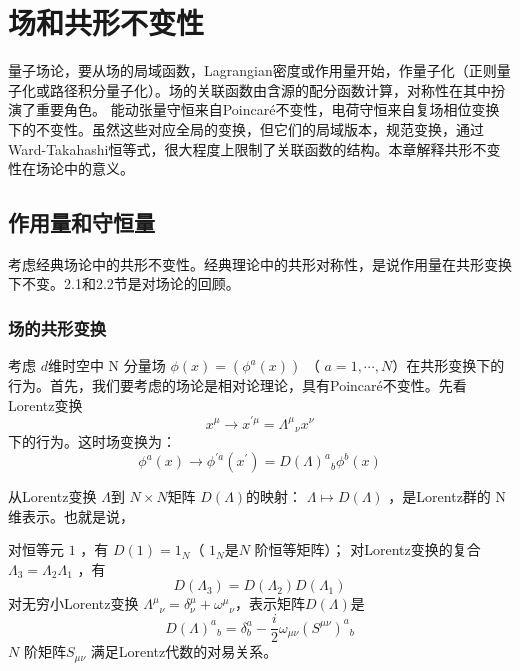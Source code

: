 \chapter{场和共形不变性}

量子场论，要从场的局域函数，Lagrangian密度或作用量开始，作量子化（正则量子化或路径积分量子化）。场的关联函数由含源的配分函数计算，对称性在其中扮演了重要角色。 能动张量守恒来自Poincaré不变性，电荷守恒来自复场相位变换下的不变性。虽然这些对应全局的变换，但它们的局域版本，规范变换，通过Ward-Takahashi恒等式，很大程度上限制了关联函数的结构。本章解释共形不变性在场论中的意义。

\section{作用量和守恒量}
考虑经典场论中的共形不变性。经典理论中的共形对称性，是说作用量在共形变换下不变。2.1和2.2节是对场论的回顾。
\subsection{场的共形变换}
考虑 $d $维时空中 N 分量场 $\phi(x)=\left(\phi^{a}(x)\right)$ （ $a=1,\cdots,N $）在共形变换下的行为。首先，我们要考虑的场论是相对论理论，具有Poincaré不变性。先看Lorentz变换
\begin{equation}
	x^{\mu} \rightarrow x^{\prime \mu}=\Lambda^{\mu} {}_{\nu}x^{\nu}
\end{equation}
下的行为。这时场变换为：
\begin{equation}
	\phi^{a}(x) \rightarrow \phi^{\prime a}\left(x^{\prime}\right)=D(\Lambda)^{a}{ }_{b} \phi^{b}(x)
\end{equation}

从Lorentz变换 $\Lambda $到 $N\times N $矩阵 $D(\Lambda) $的映射： $\Lambda \mapsto D(\Lambda)$ ，是Lorentz群的 N 维表示。也就是说，

对恒等元 $1$ ，有 $D(1)=1_N $（ $1_N $是$ N$ 阶恒等矩阵）；
对Lorentz变换的复合 $\Lambda_3=\Lambda_2\Lambda_1$ ，有
\begin{equation}
	D\left(\Lambda_{3}\right)=D\left(\Lambda_{2}\right) D\left(\Lambda_{1}\right)
\end{equation}
对无穷小Lorentz变换 $\Lambda^{\mu}{}_{\nu}=\delta_{\nu}^{\mu}+\omega^{\mu}{}_{\nu} $，表示矩阵$ D(\Lambda) $是
\begin{equation}
	D(\Lambda)^{a}{}_{b}=\delta_{b}^{a}-\frac{i}{2} \omega_{\mu \nu}\left(S^{\mu \nu}\right)^{a}{}_{b}
\end{equation}
$N$ 阶矩阵$ S_{\mu \nu}$ 满足Lorentz代数的对易关系。

